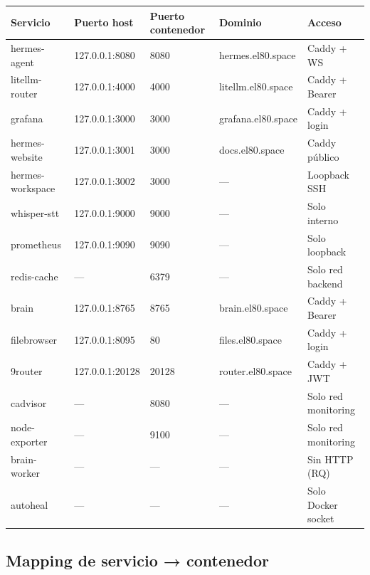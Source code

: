 \documentclass[11pt,a4paper]{article}
\begin{document}
\begin{center}
\begin{longtable}{|l|l|l|l|l|}
\hline
\rowcolor{hermesblue}\color{white}\textbf{Servicio} & \color{white}\textbf{Puerto host} & \color{white}\textbf{Puerto contenedor} & \color{white}\textbf{Dominio} & \color{white}\textbf{Acceso}\\
\hline
\endhead
hermes-agent      & 127.0.0.1:8080  & 8080  & hermes.el80.space  & Caddy + WS\\
litellm-router    & 127.0.0.1:4000  & 4000  & litellm.el80.space & Caddy + Bearer\\
grafana           & 127.0.0.1:3000  & 3000  & grafana.el80.space & Caddy + login\\
hermes-website    & 127.0.0.1:3001  & 3000  & docs.el80.space    & Caddy público\\
hermes-workspace  & 127.0.0.1:3002  & 3000  & —                  & Loopback SSH\\
whisper-stt       & 127.0.0.1:9000  & 9000  & —                  & Solo interno\\
prometheus        & 127.0.0.1:9090  & 9090  & —                  & Solo loopback\\
redis-cache       & —               & 6379  & —                  & Solo red backend\\
brain             & 127.0.0.1:8765  & 8765  & brain.el80.space   & Caddy + Bearer\\
filebrowser       & 127.0.0.1:8095  & 80    & files.el80.space   & Caddy + login\\
9router           & 127.0.0.1:20128 & 20128 & router.el80.space  & Caddy + JWT\\
cadvisor          & —               & 8080  & —                  & Solo red monitoring\\
node-exporter     & —               & 9100  & —                  & Solo red monitoring\\
brain-worker      & —               & —     & —                  & Sin HTTP (RQ)\\
autoheal          & —               & —     & —                  & Solo Docker socket\\
\hline
\end{longtable}
\end{center}

\subsection{Mapping de servicio → contenedor}
\end{document}
